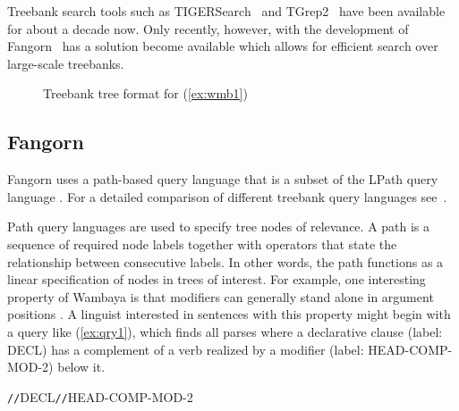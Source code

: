 Treebank search tools such as TIGERSearch~\citep{Lez:Kon:00} and 
TGrep2~\citep{Roh:05} have been available for about a decade now.  
Only recently, however, with the development of Fangorn~\citep{Gho:Bir:10} 
has a solution become available which allows for efficient search 
over large-scale treebanks. 

\begin{figure}
\centering
{}
\caption{Treebank tree format for (\ref{ex:wmb1})}
\label{fig:sent-tb}
\end{figure}

\subsection{Fangorn}
\label{sec:tss}

Fangorn uses a path-based query language that is
a subset of the LPath query language \citep{Bir:Che:Sus:Lee:Zhe:06}.  For
a detailed comparison of different treebank query languages
see~\citet{Lai:Bir:04}. 

Path query languages are used to specify tree nodes of relevance.  A
path is a sequence of required node labels together with operators
that state the relationship between consecutive labels.  In other
words, the path functions as a linear specification of nodes in trees
of interest. For example, one interesting property of Wambaya is that
modifiers can generally stand alone in argument positions
\citep{Nordlinger:98a}.  A linguist interested in 
sentences with this property might begin with a query like
(\ref{ex:qry1}), which finds all parses where a declarative clause
(label: {\small DECL}) has a complement of a verb realized by a modifier
(label: {\small HEAD-COMP-MOD-2}) below it.

\begin{exe}
\ex\label{ex:qry1}\small
\verb=//=DECL\verb=//=HEAD-COMP-MOD-2
\end{exe}

\begin{table}[tp]
\caption{Query operators and their symbols}
\label{tab:axis-ops}
\end{table}

